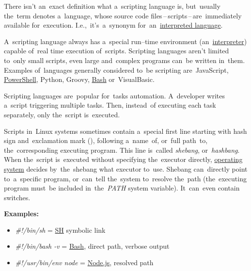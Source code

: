 \label{scriptinglanguages}
There isn't an~exact definition what a~scripting language is, but~usually the~term denotes a~language, whose source code files\,--\,scripts\,--\,are~immediately available for~execution. I.e.,~it's~a~synonym for~an~\hyperref[compiledinterpretedlanguages]{interpreted language}.

A~scripting language always has a~special run--time environment (an~\hyperref[compiledinterpretedlanguages]{interpreter}) capable of~real time execution of~scripts. Scripting languages aren't limited to~only small scripts, even large and~complex programs can~be written in~them. Examples of~languages generally considered to~be scripting are~JavaScript, \hyperref[powershell]{PowerShell}, Python, Groovy, \hyperref[shbash]{Bash} or~VisualBasic.

Scripting languages are~popular for~tasks automation. A~developer writes a~script triggering multiple tasks. Then, instead~of executing each task separately, only the~script is~executed.

\label{shebang}
Scripts in~Linux systems sometimes contain a~special first line starting with hash sign and~exclamation mark (\textitquoted{\#!}), following a~name~of, or~full path~to, the~corresponding executing program. This line is~called \textit{shebang}, or~\textit{hashbang}. When the~script is~executed without specifying the~executor directly, \hyperref[os]{operating system} decides by~the~shebang what executor to~use. Shebang can~directly point to~a~specific program, or~can~tell the~system to~resolve the~path (the~executing program must~be included in~the~\textit{PATH} system variable). It~can~even contain switches.
\newline

\noindent \textbf{Examples:}
\begin{itemize}
    \item \textit{\#!/bin/sh} = \hyperref[shbash]{SH} symbolic link
    \item \textit{\#!/bin/bash -v} = \hyperref[shbash]{Bash}, direct path, verbose output
    \item \textit{\#!/usr/bin/env node} = \hyperref[nodejs]{Node.js}, resolved path
\end{itemize}
